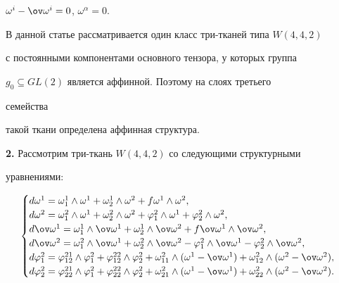 $\omega^i-\ov\omega^i=0$, $\omega^\alpha=0$. 


 


В данной статье рассматривается один класс три-тканей типа $W(4,4,2)$ 


с постоянными компонентами основного тензора, у которых группа 


$g_0\subseteq GL(2)$ является аффинной. Поэтому на слоях третьего 


семейства 


такой ткани определена аффинная структура. 


\medskip 


 


{\bf 2.} Рассмотрим три-ткань $W(4,4,2)$ со следующими структурными 


уравнениями: 


\begin{equation} 


\begin{cases} 


d\omega^1=\omega^1_1\wedge\omega^1+ 


\omega^1_2\wedge\omega^2+f\omega^1\wedge\omega^2, \\ 


d\omega^2=\omega^2_1\wedge\omega^1+\omega^2_2\wedge 


\omega^2+\varphi^2_1\wedge\omega^1+\varphi^2_2\wedge\omega^2,\\ 


d\ov\omega^1=\omega^1_1\wedge\ov\omega^1+\omega^1_2\wedge 


\ov\omega^2+f\ov\omega^1\wedge\ov\omega^2,\\ 


d\ov\omega^2=\omega^2_1\wedge\ov\omega^1+\omega^2_2 


\wedge\ov\omega^2-\varphi^2_1\wedge\ov\omega^1- 


\varphi^2_2\wedge\ov\omega^2, \\ 


d\varphi^2_1=\varphi^{21}_{12}\wedge\varphi^2_1+ 


\varphi^{22}_{12}\wedge\varphi^2_2+\omega^2_{11}\wedge 


(\omega^1-\ov\omega^1)+\omega^2_{12}\wedge 


(\omega^2-\ov\omega^2), \\ 


d\varphi^2_2=\varphi^{21}_{22}\wedge\varphi^2_1+ 


\varphi^{22}_{22}\wedge\varphi^2_2+\omega^2_{21}\wedge 


(\omega^1-\ov\omega^1)+\omega^2_{22}\wedge 


(\omega^2-\ov\omega^2). 


\end{cases} 


\end{equation} 


